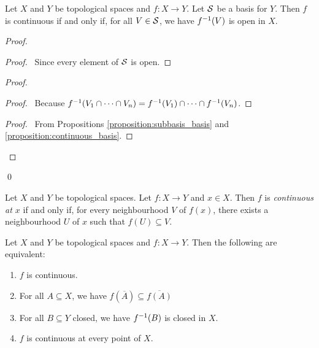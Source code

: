 \begin{proposition}
    Let $X$ and $Y$ be topological spaces and $f : X \rightarrow Y$. Let $\mathcal{S}$ be a basis for $Y$. Then $f$
    is continuous if and only if, for all $V \in \mathcal{S}$, we have ${f}^{-1}(V)$ is open in $X$.
\end{proposition}

\begin{proof}
    \pf
    \begin{proof}
        \pf\ Since every element of $\mathcal{S}$ is open.
    \end{proof}
    \begin{proof}
        \begin{proof}
            \pf\ Because ${f}^{-1}(V_1 \cap \cdots \cap V_n) = {f}^{-1}(V_1) \cap \cdots \cap {f}^{-1}(V_n)$.
        \end{proof}
        \qedstep
        \begin{proof}
            \pf\ From Propositions \ref{proposition:subbasis_basis} and \ref{proposition:continuous_basis}.
        \end{proof}
    \end{proof}
    \qed
\end{proof}

\begin{definition}
    Let $X$ and $Y$ be topological spaces. Let $f : X \rightarrow Y$ and $x \in X$. Then $f$ is
    \emph{continuous at $x$} if and only if, for every neighbourhood $V$ of $f(x)$, there exists a
    neighbourhood $U$ of $x$ such that $f(U) \subseteq V$.
\end{definition}

\begin{theorem}
    \label{theorem:continuous}
    Let $X$ and $Y$ be topological spaces and $f : X \rightarrow Y$. Then the following are equivalent:
    \begin{enumerate}
        \item $f$ is continuous.
        \item For all $A \subseteq X$, we have $f(\overline{A}) \subseteq \overline{f(A)}$
        \item For all $B \subseteq Y$ closed, we have ${f}^{-1}(B)$ is closed in $X$.
        \item $f$ is continuous at every point of $X$.
    \end{enumerate}
\end{theorem}

